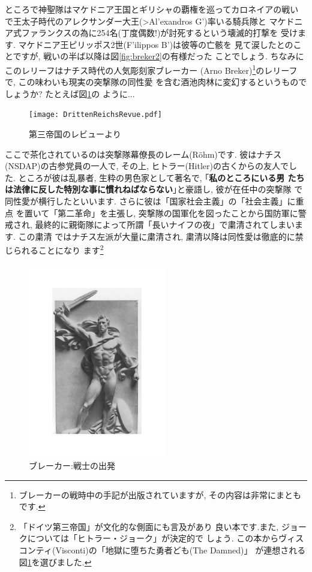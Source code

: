 ところで神聖隊はマケドニア王国とギリシャの覇権を巡ってカロネイアの戦い
で王太子時代のアレクサンダー大王(\textgreek{>Al'exandros G'})率いる騎兵隊と
マケドニア式ファランクスの為に254名(丁度偶数!)が討死するという壊滅的打撃を
受けます. マケドニア王ピリッポス2世(\textgreek{F'ilippos B'})は彼等の亡骸を
見て涙したとのことですが, 戦いの半ば以降は図\ref{fig:breker2}の有様だった
ことでしょう. ちなみにこのレリーフはナチス時代の人気彫刻家ブレーカー
(Arno Breker)\footnote{ブレーカーの戦時中の手記が出版されていますが,
 その内容は非常にまともです.}のレリーフで, この味わいも現実の突撃隊の同性愛
を含む酒池肉林に変幻するというものでしょうか? たとえば図\ref{fig:rrevue}の
ように... 

\begin{figure}[htbp]
\begin{center}
\texttt{[image: DrittenReichsRevue.pdf]}
\caption{第三帝国のレビューより\cite{関}}
\label{fig:rrevue}
\end{center}
\end{figure}

ここで茶化されているのは突撃隊幕僚長のレーム(R\"ohm)です. 彼はナチス
(NSDAP)の古参党員の一人で, その上, ヒトラー(Hitler)の古くからの友人でした.
 ところが彼は乱暴者, 生粋の男色家として著名で, ｢\textbf{私のところにいる男
 たちは法律に反した特別な事に慣れねばならない}｣と豪語し, 彼が在任中の突撃隊
で同性愛が横行したといいます. さらに彼は「国家社会主義」の「社会主義」に重点
を置いて「第二革命」を主張し, 突撃隊の国軍化を図ったことから国防軍に警戒され,
最終的に親衛隊によって所謂「長いナイフの夜」で粛清されてしまいます. この粛清
ではナチス左派が大量に粛清され, 粛清以降は同性愛は徹底的に禁じられることになり
ます\footnote{「ドイツ第三帝国」\cite{クラーザー}が文化的な側面にも言及があり
良い本です.また, ジョークについては「ヒトラー・ジョーク」\cite{関}が決定的で
しょう. この本からヴィスコンティ(Visconti)の「地獄に堕ちた勇者ども(The Damned)」
が連想される図\ref{fig:rrevue}を選びました.}
\newpage

\begin{figure}
\includegraphics[width=6cm]{Breker2_relief.pdf}
\caption{ブレーカー:戦士の出発}
\label{fig:breker1}
\end{figure}

